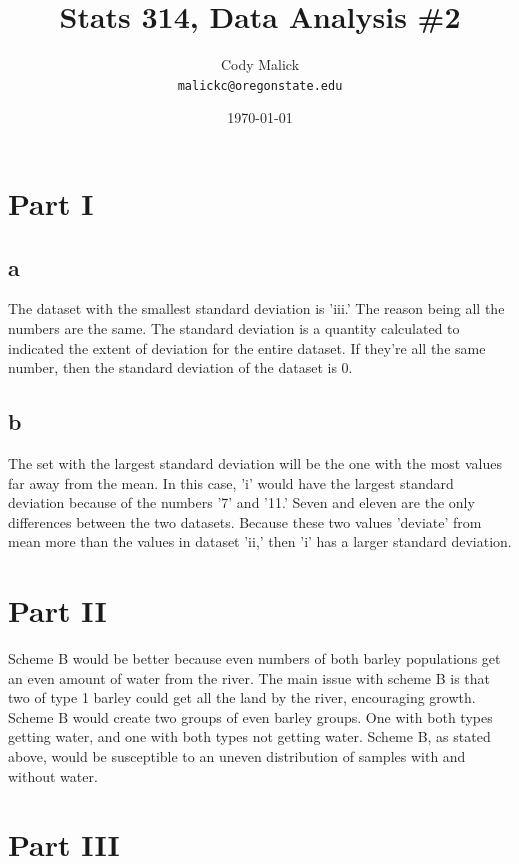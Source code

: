 \documentclass[10pt,letterpaper]{article}
\begin{document}
  \title{Stats 314, Data Analysis \#2}
  \author{Cody Malick\\
  \texttt{malickc@oregonstate.edu}}
  \date{\today}
  \maketitle

\section*{Part I}
\subsection*{a}
The dataset with the smallest standard deviation is 'iii.' The reason being
all the numbers are the same. The standard deviation is a quantity calculated
to indicated the extent of deviation for the entire dataset. If they're all the
same number, then the standard deviation of the dataset is 0.

\subsection*{b}
The set with the largest standard deviation will be the one with the most
values far away from the mean. In this case, 'i' would have the largest standard
deviation because of the numbers '7' and '11.' Seven and eleven are the only
differences between the two datasets. Because these two values 'deviate' from
mean more than the values in dataset 'ii,' then 'i' has a larger standard
deviation.

\section*{Part II}
Scheme B would be better because even numbers of both barley populations get
an even amount of water from the river. The main issue with scheme B is that
two of type 1 barley could get all the land by the river, encouraging growth.\\

Scheme B would create two groups of even barley groups. One with both types
getting water, and one with both types not getting water. Scheme B, as stated
above, would be susceptible to an uneven distribution of samples with and without
water.

\section*{Part III}
\end{document}
